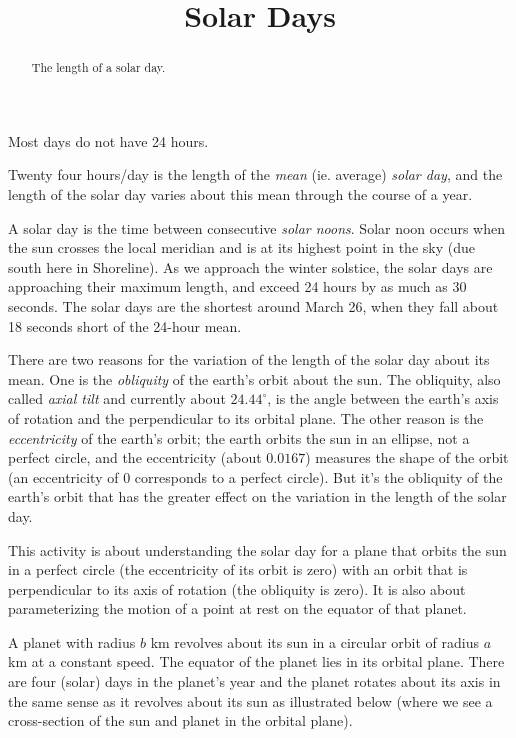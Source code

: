 \documentclass{ximera}
\title{Solar Days}
\begin{document}
\begin{abstract}
The length of a solar day.
\end{abstract}
\maketitle


Most days do not have 24 hours.

Twenty four hours/day is the length of the \emph{mean} (ie. average) \emph{solar day}, and the length of the solar day varies about this mean through the course of a year.

A solar day is the time between consecutive \emph{solar noons}.  Solar noon occurs when the sun crosses the local meridian and is at its highest point in the sky (due south here in Shoreline). As we approach the winter solstice, the solar days are approaching their maximum length, and exceed 24 hours by as much as 30 seconds. The solar days are the shortest around March 26, when they fall about 18 seconds short of the 24-hour mean.

There are two reasons for the variation of the length of the solar day about its mean. One is the \emph{obliquity} of the earth's orbit about the sun. The obliquity, also called \emph{axial tilt} and currently about $24.44^\circ$, is the angle between the earth's axis of rotation and the perpendicular to its orbital plane. The other reason is the \emph{eccentricity} of the earth's orbit; the earth orbits the sun in an ellipse, not a perfect circle, and the eccentricity (about $0.0167$) measures the shape of the orbit (an eccentricity of $0$ corresponds to a perfect circle). But it's the obliquity of the earth's orbit that has the greater effect on the variation in the length of the solar day.

This activity is about understanding the solar day for a plane that orbits the sun in a perfect circle (the eccentricity of its orbit is zero) with an orbit that is perpendicular to its axis of rotation (the obliquity is zero). It is also about parameterizing the motion of a point at rest on the equator of that planet.



\begin{example} \label{Ec56r4322}
A planet with radius $b$ km revolves about its sun in a circular orbit of radius $a$ km at a constant speed. The equator of the planet lies in its orbital plane. There are four (solar) days in the planet's year and the planet rotates about its axis in the same sense as it revolves about its sun as illustrated below (where we see a cross-section of the sun and planet in the orbital plane).
\end{example}
\end{document}

